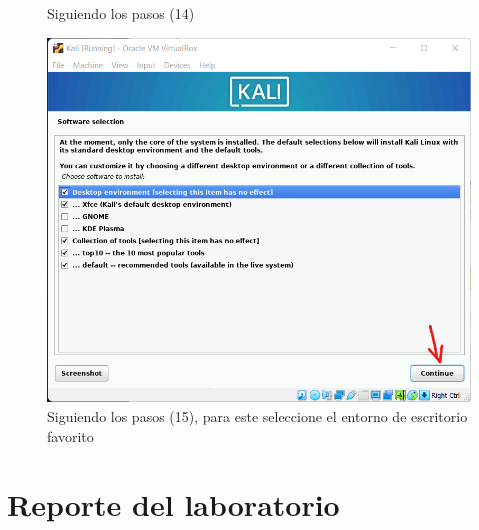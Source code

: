 \documentclass[stu, 12pt, letterpaper, donotrepeattitle, floatsintext, natbib, helv]{apa7}
\begin{document}
\begin{enumerate}
\begin{figure} [H]
        \caption{Siguiendo los pasos (14)}
        \label{fig:Inst14}
    \end{figure}
    \begin{figure} [H]
        \includegraphics[width = 1\textwidth]{Installation15.png}
        \caption{Siguiendo los pasos (15), para este seleccione el entorno de escritorio favorito}
        \label{fig:Inst15}
    \end{figure}
\end{enumerate}


\section*{Reporte del laboratorio}
{}
\end{document}
